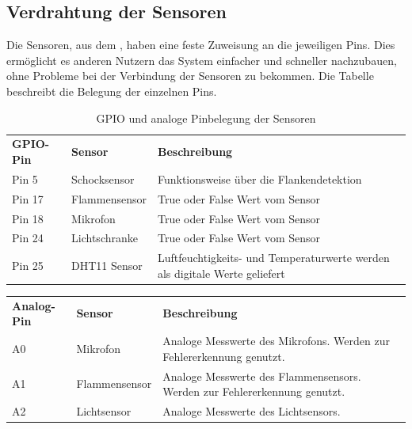\subsection{Verdrahtung der Sensoren}\label{Verdrahtung_der_Sensoren}
Die Sensoren, aus dem , haben eine feste Zuweisung an die jeweiligen Pins. Dies ermöglicht es anderen Nutzern das System einfacher und schneller nachzubauen, ohne Probleme bei der Verbindung der Sensoren zu bekommen. Die Tabelle  beschreibt die Belegung der einzelnen Pins.
\begin{table}[htp]
	\caption{GPIO und analoge Pinbelegung der Sensoren}
	\label{tab:Pinbelegung}
	\begin{tabular}{p{} p{} p{}}
		\textbf{GPIO-Pin}	& \textbf{Sensor} & \textbf{Beschreibung} \\
		Pin 5 		& Schocksensor 	& Funktionsweise über die Flankendetektion\\	
		Pin 17		& Flammensensor	& True oder False Wert vom Sensor\\
		Pin 18		& Mikrofon		& True oder False Wert vom Sensor\\
		Pin 24		& Lichtschranke	& True oder False Wert vom Sensor\\
		Pin 25		& DHT11 Sensor	& Luftfeuchtigkeits- und Temperaturwerte werden als digitale Werte geliefert
	\end{tabular}
\end{table}
\begin{table}[htp]
	\begin{tabular}{p{} p{} p{}}
		\textbf{Analog-Pin}	& \textbf{Sensor} & \textbf{Beschreibung} \\
		A0	& Mikrofon 		& Analoge Messwerte des Mikrofons. Werden zur Fehlererkennung genutzt. \\
		A1	& Flammensensor	& Analoge Messwerte des Flammensensors. Werden zur Fehlererkennung genutzt.\\
		A2	& Lichtsensor	& Analoge Messwerte des Lichtsensors.
	\end{tabular}
\end{table}

